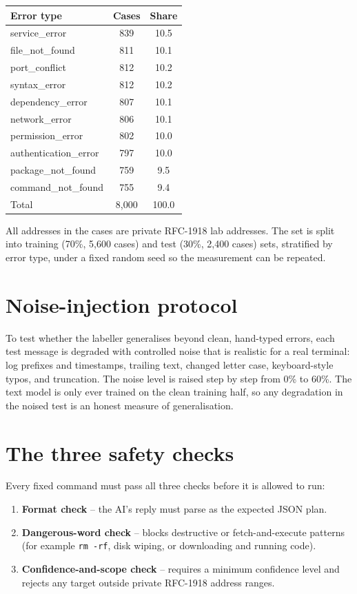 \begin{center}
\begin{tabular}{@{}lcc@{}}
  \toprule
  \textbf{Error type} & \textbf{Cases} & \textbf{Share}\\
  \midrule
  service\_error & 839 & 10.5\\
  file\_not\_found & 811 & 10.1\\
  port\_conflict & 812 & 10.2\\
  syntax\_error & 812 & 10.2\\
  dependency\_error & 807 & 10.1\\
  network\_error & 806 & 10.1\\
  permission\_error & 802 & 10.0\\
  authentication\_error & 797 & 10.0\\
  package\_not\_found & 759 & 9.5\\
  command\_not\_found & 755 & 9.4\\
  \midrule
  Total & 8,000 & 100.0\\
  \bottomrule
\end{tabular}
\end{center}

All addresses in the cases are private RFC-1918 lab addresses. The set is split
into training (70\%, 5,600 cases) and test (30\%, 2,400 cases) sets, stratified
by error type, under a fixed random seed so the measurement can be repeated.

\section{Noise-injection protocol}

To test whether the labeller generalises beyond clean, hand-typed errors, each
test message is degraded with controlled noise that is realistic for a real
terminal: log prefixes and timestamps, trailing text, changed letter case,
keyboard-style typos, and truncation. The noise level is raised step by step
from 0\% to 60\%. The text model is only ever trained on the clean training
half, so any degradation in the noised test is an honest measure of
generalisation.

\section{The three safety checks}

Every fixed command must pass all three checks before it is allowed to run:

\begin{enumerate}
  \item \textbf{Format check} -- the AI's reply must parse as the expected JSON
  plan.
  \item \textbf{Dangerous-word check} -- blocks destructive or
  fetch-and-execute patterns (for example \texttt{rm -rf}, disk wiping, or
  downloading and running code).
  \item \textbf{Confidence-and-scope check} -- requires a minimum confidence
  level and rejects any target outside private RFC-1918 address ranges.
\end{enumerate}

